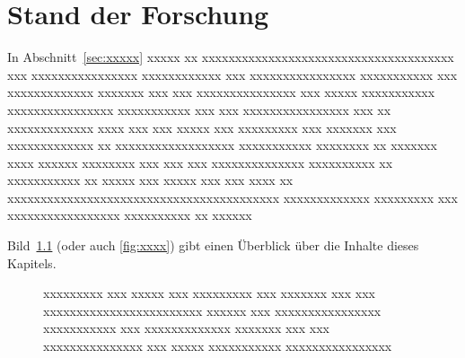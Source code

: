 %
\chapter{Stand der Forschung}\label{chap:StandForschungTechnik}
In Abschnitt~\ref{sec:xxxxx} xxxxx xx xxxxxxxxxxxxxxxxxxxxxxxxxxxxxxxxxxxxxx xxx xxxxxxxxxxxxxxxx xxxxxxxxxxxx xxx xxxxxxxxxxxxxxxx xxxxxxxxxxx xxx xxxxxxxxxxxxx xxxxxxx xxx xxx xxxxxxxxxxxxxxx xxx xxxxx xxxxxxxxxxx xxxxxxxxxxxxxxxx xxxxxxxxxxx xxx xxx xxxxxxxxxxxxxxxx xxx xx xxxxxxxxxxxxx xxxx xxx xxx xxxxx xxx xxxxxxxxx xxx xxxxxxx xxx xxxxxxxxxxxxx xx xxxxxxxxxxxxxxxxxx xxxxxxxxxxx xxxxxxxx xx xxxxxxx xxxx xxxxxx xxxxxxxx xxx xxx xxx xxxxxxxxxxxxxx xxxxxxxxxx xx xxxxxxxxxxx xx xxxxx xxx xxxxx xxx xxx xxxx xx xxxxxxxxxxxxxxxxxxxxxxxxxxxxxxxxxxxxxxxxx xxxxxxxxxxxxx \cite{KEYH} xxxxxxxxx xxx xxxxxxxxxxxxxxxxx xxxxxxxxxx xx xxxxxx

Bild~\ref{fig:xxxx} (oder auch \autoref{fig:xxxx}) gibt einen Überblick über die Inhalte dieses Kapitels.
\begin{figure}
	\centering
	\caption[Ggf. Kurztitel für Bildverzeichnis]{xxxxxxxxx xxx xxxxx xxx xxxxxxxxx xxx xxxxxxx xxx xxx xxxxxxxxxxxxxxxxxxxxxxxx xxxxxx xxx xxxxxxxxxxxxxxxx xxxxxxxxxxx xxx xxxxxxxxxxxxx xxxxxxx xxx xxx xxxxxxxxxxxxxxx xxx xxxxx xxxxxxxxxxx xxxxxxxxxxxxxxxx}
  \label{fig:xxxx}
\end{figure}

